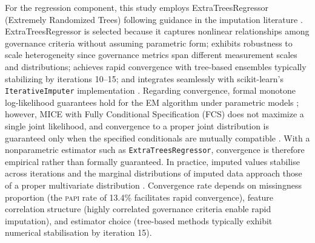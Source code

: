 \documentclass[12pt,a4paper]{article}
\newcommand{\PAPI}{\textsc{papi}\xspace}
\begin{document}
For the regression component, this study employs ExtraTreesRegressor (Extremely Randomized Trees) following guidance in the imputation literature \citep{Doove2014}. ExtraTreesRegressor is selected because it captures nonlinear relationships among governance criteria without assuming parametric form; exhibits robustness to scale heterogeneity since governance metrics span different measurement scales and distributions; achieves rapid convergence with tree-based ensembles typically stabilizing by iterations 10--15; and integrates seamlessly with scikit-learn's \texttt{IterativeImputer} implementation \citep{Pedregosa2011}. Regarding convergence, formal monotone log-likelihood guarantees hold for the EM algorithm under parametric models \citep{Dempster1977}; however, MICE with Fully Conditional Specification (FCS) does not maximize a single joint likelihood, and convergence to a proper joint distribution is guaranteed only when the specified conditionals are mutually compatible \citep{vanBuuren2018}. With a nonparametric estimator such as \texttt{ExtraTreesRegressor}, convergence is therefore empirical rather than formally guaranteed. In practice, imputed values stabilise across iterations and the marginal distributions of imputed data approach those of a proper multivariate distribution \citep{vanBuuren2011, vanBuuren2018}. Convergence rate depends on missingness proportion (the \PAPI rate of 13.4\% facilitates rapid convergence), feature correlation structure (highly correlated governance criteria enable rapid imputation), and estimator choice (tree-based methods typically exhibit numerical stabilisation by iteration 15).
\end{document}
